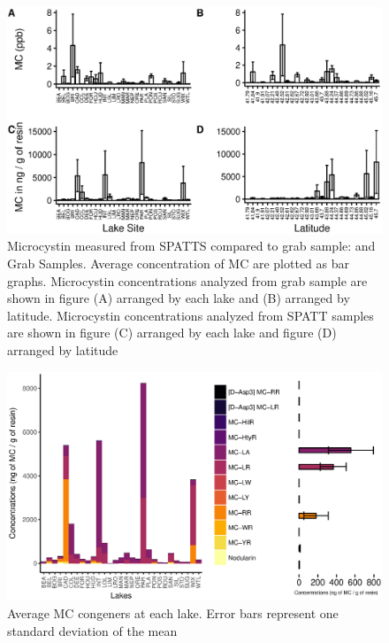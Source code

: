 \begin{figure}[!hp]
\includegraphics[width=\textwidth]{figures/spatttboxplotlake}
\caption{
Microcystin measured from SPATTS compared to grab sample: and Grab Samples. Average concentration of MC are plotted as bar graphs. Microcystin concentrations analyzed from grab sample are shown in figure (A) arranged by each lake and (B) arranged by latitude. Microcystin concentrations analyzed from SPATT samples are shown in figure (C) arranged by each lake and figure (D) arranged by latitude
}
\label{fig:spattbox}
\end{figure}



\begin{figure}[!ht]
\includegraphics[width=\textwidth]{figures/barspatts}
\caption{Average MC congeners at each lake. Error bars represent one standard deviation of the mean}
\label{fig:barspatts}
\end{figure}

